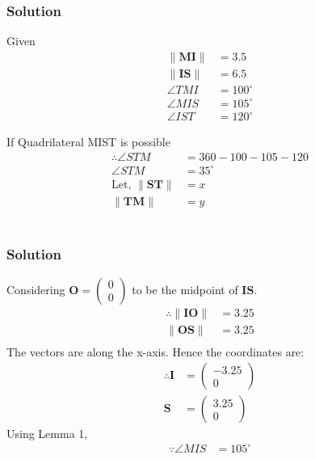 \documentclass{beamer}
\theoremstyle{remark}
\providecommand{\norm}[1]{\lVert#1\rVert}
\renewcommand{\vec}[1]{\mathbf{#1}}
\newcommand{\myvec}[1]{\ensuremath{\begin{pmatrix}#1\end{pmatrix}}}
\begin{document}
\begin{frame}
    \small
    \frametitle{Solution}
    \begin{block}{Given}
\begin{align}
    \norm{\vec{MI}} &= 3.5\\
    \norm{\vec{IS}} &= 6.5\\
    \angle{TMI} &= 100^{\circ}\\
    \angle{MIS} &= 105^{\circ}\\
    \angle{IST} &= 120^{\circ}
\end{align}
    \end{block}
    \begin{block}{If Quadrilateral MIST is possible}
        \begin{align}
    \therefore \angle{STM} &= 360 - 100 - 105 - 120\\
    \angle{STM} &= 35^{\circ}\\
    \text{Let, } \norm{\vec{ST}} &= x\\
    \norm{\vec{TM}} &= y
\end{align}\\
    \end{block}
\end{frame}
\begin{frame}
\small
    \frametitle{Solution}
    \begin{block}{}
    Considering $\vec{O} = \myvec{0\\0}$ to be the midpoint of $\vec{IS}$.
\begin{align}
    \therefore\norm{\vec{IO}} &= 3.25\\
    \norm{\vec{OS}} &= 3.25\\
\end{align}
The vectors are along the x-axis. Hence the coordinates are:
\begin{align}
    \therefore \vec{I} &= \myvec{-3.25\\0}\\
    \vec{S} &= \myvec{3.25\\0}
\end{align}
Using Lemma 1,
\begin{align}
    \because \angle MIS &= 105^{\circ}
    \end{align}
    \end{block}
\end{frame}
\end{document}
